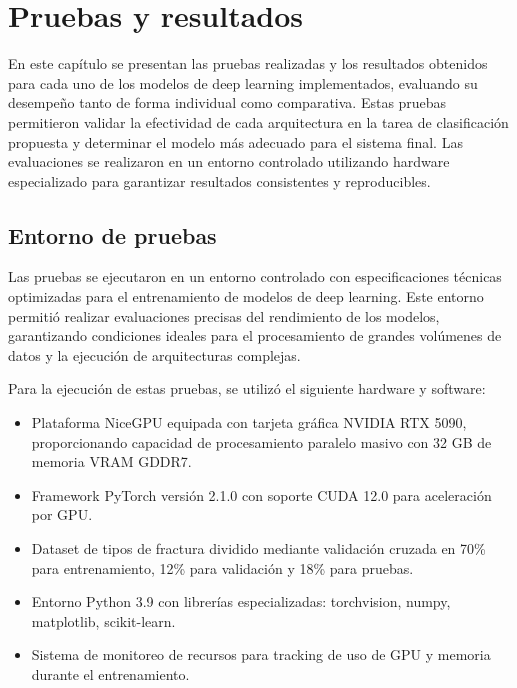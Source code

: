 \fancyhead{}
\fancyfoot{}
\pagestyle{plain}


\chapter{Pruebas y resultados}

En este capítulo se presentan las pruebas realizadas y los resultados obtenidos para cada uno de los modelos de deep learning implementados, evaluando su desempeño tanto de forma individual como comparativa. Estas pruebas permitieron validar la efectividad de cada arquitectura en la tarea de clasificación propuesta y determinar el modelo más adecuado para el sistema final. Las evaluaciones se realizaron en un entorno controlado utilizando hardware especializado para garantizar resultados consistentes y reproducibles.

\section{Entorno de pruebas}

Las pruebas se ejecutaron en un entorno controlado con especificaciones técnicas optimizadas para el entrenamiento de modelos de deep learning. Este entorno permitió realizar evaluaciones precisas del rendimiento de los modelos, garantizando condiciones ideales para el procesamiento de grandes volúmenes de datos y la ejecución de arquitecturas complejas.

Para la ejecución de estas pruebas, se utilizó el siguiente hardware y software:

\begin{itemize}
\item Plataforma NiceGPU equipada con tarjeta gráfica NVIDIA RTX 5090, proporcionando capacidad de procesamiento paralelo masivo con 32 GB de memoria VRAM GDDR7.
\item Framework PyTorch versión 2.1.0 con soporte CUDA 12.0 para aceleración por GPU.
\item Dataset de tipos de fractura dividido mediante validación cruzada en 70\% para entrenamiento, 12\% para validación y 18\% para pruebas.
\item Entorno Python 3.9 con librerías especializadas: torchvision, numpy, matplotlib, scikit-learn.
\item Sistema de monitoreo de recursos para tracking de uso de GPU y memoria durante el entrenamiento.
\end{itemize}

